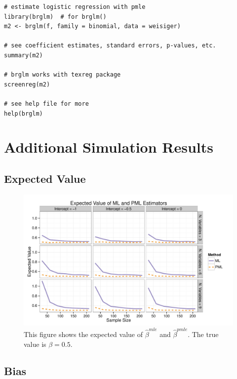 \documentclass[12pt]{article}
\begin{document}
\begin{appendix}
\begin{footnotesize}
\begin{verbatim}
# estimate logistic regression with pmle
library(brglm)  # for brglm()
m2 <- brglm(f, family = binomial, data = weisiger)

# see coefficient estimates, standard errors, p-values, etc.
summary(m2)

# brglm works with texreg package
screenreg(m2)

# see help file for more
help(brglm)
\end{verbatim}
\end{footnotesize}



\section{Additional Simulation Results}\label{sec:app-sims}

\subsection{Expected Value}

\begin{figure}[H]
\begin{center}
\includegraphics[width = \textwidth]{figs/sims-ev.pdf}
\caption{This figure shows the expected value of $\hat{\beta}^{mle}$ and $\hat{\beta}^{pmle}$. The true value is $\beta = 0.5$.}\label{fig:ev}
\end{center}
\end{figure}

\subsection{Bias}


\end{appendix}
\end{document}
